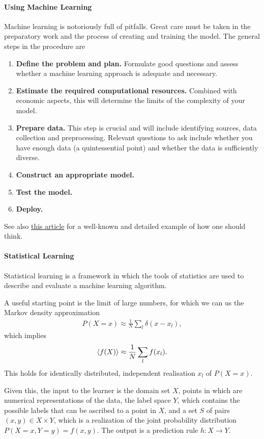\paragraph{Using Machine Learning}
Machine learning is notoriously full of pitfalls. Great care must be taken in the preparatory work and the process of creating and training the model. The general steps in the procedure are
\begin{enumerate}
	\item \textbf{Define the problem and plan.} Formulate good questions and assess whether a machine learning approach is adequate and necessary.
	\item \textbf{Estimate the required computational resources.} Combined with economic aspects, this will determine the limits of the complexity of your model.
	\item \textbf{Prepare data.} This step is crucial and will include identifying sources, data collection and preprocessing. Relevant questions to ask include whether you have enough data (a quintessential point) and whether the data is sufficiently diverse.
	\item \textbf{Construct an appropriate model.}
	\item \textbf{Test the model.}
	\item \textbf{Deploy.}
\end{enumerate}

See also \href{https://karpathy.github.io/2019/04/25/recipe/}{this article} for a well-known and detailed example of how one should think.

\paragraph{Statistical Learning}
Statistical learning is a framework in which the tools of statistics are used to describe and evaluate a machine learning algorithm.

A useful starting point is the limit of large numbers, for which we can us the Markov density approximation
\begin{align*}
	P(X = x) \approx \frac{1}{N}\sum\limits_{l}\delta(x - x_{l}),
\end{align*}
which implies
\begin{align*}
	\expval{f(X)} \approx \frac{1}{N}\sum\limits_{l}f(x_{l}).
\end{align*}
This holds for identically distributed, independent realisation $x_{l}$ of $P(X = x)$.

Given this, the input to the learner is the domain set $X$, points in which are numerical representations of the data, the label space $Y$, which contains the possible labels that can be ascribed to a point in $X$, and a set $S$ of pairs $(x, y)\in X\times Y$, which is a realization of the joint probability distribution $P(X = x, Y = y) = f(x, y)$. The output is a prediction rule $h: X\to Y$.

